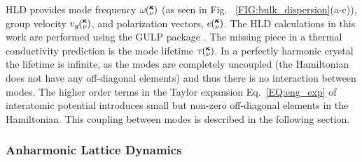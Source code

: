 HLD provides mode frequency $\omega \kv$ (as seen in Fig. ~\ref{FIG:bulk_dispersion}(a-c)), group velocity $v_g\kv$, and polarization vectors, $e\kv$. The HLD calculations in this work are performed using the GULP package \cite{GULP}. The missing piece in a thermal conductivity prediction is the mode lifetime $\tau \kv$. In a perfectly harmonic crystal the lifetime is infinite, as the modes are completely uncoupled (the Hamiltonian does not have any off-diagonal elements) and thus there is no interaction between modes. The higher order terms in the Taylor expansion Eq.~\ref{EQ:eng_exp} of interatomic potential introduces small but non-zero off-diagonal elements in the Hamiltonian. This coupling between modes is described in the following section.

\subsubsection{Anharmonic Lattice Dynamics}

